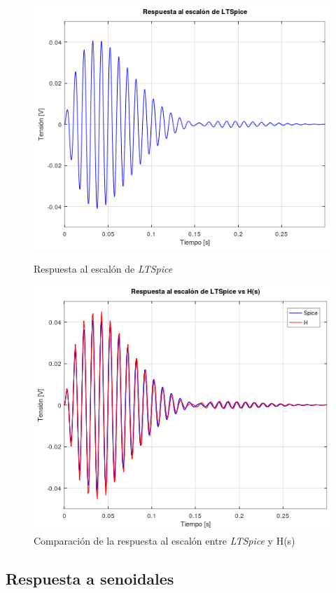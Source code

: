 \documentclass[11pt,a4paper]{report}
\begin{document}
\begin{figure}[h!]
\centering
\includegraphics[scale=0.9]{rtaEscalonSpice.png}
\caption{Respuesta al escalón de \textit{LTSpice}}
\vspace{2 mm}
\includegraphics[scale=0.85]{rtaEscalonSpiceComp.png}
\caption{Comparación de la respuesta al escalón entre \textit{LTSpice} y H(s)}
\end{figure}

\subsection*{Respuesta a senoidales}
\end{document}
